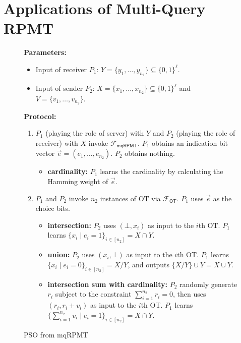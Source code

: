 \documentclass[a4paper,10pt]{article}
\newcommand{\FuncOT}{\mathcal{F}_\mathsf{OT}}
\newcommand{\FuncMQRPMT}{\mathcal{F}_\mathsf{mqRPMT}}
\begin{document}
\section{Applications of Multi-Query RPMT}
\begin{figure}[!hbtp]
\begin{framed}
\begin{minipage}[center]{\textwidth}
\begin{trivlist}
\item \textbf{Parameters:} 
\begin{itemize}
    \item Input of receiver $P_1$: $Y = \{y_1, \dots, y_{n_1}\} \subseteq \{0,1\}^\ell$.

    \item Input of sender $P_2$: $X = \{x_1, \dots, x_{n_2}\} \subseteq \{0,1\}^\ell$ 
        and $V = \{v_1, \dots, v_{n_2}\}$.
\end{itemize}

\item \textbf{Protocol:}

\begin{enumerate}
\item $P_1$ (playing the role of server) with $Y$ and $P_2$ (playing the role of receiver) with $X$
    invoke $\FuncMQRPMT$. $P_1$ obtains an indication bit vector $\vec{e} = (e_1, \dots, e_{n_2})$. 
    $P_2$ obtains nothing.  

    \begin{itemize}
        \item \textbf{cardinality:} $P_1$ learns the cardinality by calculating the Hamming weight of $\vec{e}$. 
    \end{itemize}

\item $P_1$ and $P_2$ invoke $n_2$ instances of OT via $\FuncOT$. 
    $P_1$ uses $\vec{e}$ as the choice bits. 


\begin{itemize}
    \item \textbf{intersection:} $P_2$ uses $(\bot, x_i)$ as input to the $i$th OT. 
        $P_1$ learns $\{x_i \mid e_i = 1\}_{i \in [n_2]} = X \cap Y$. 

    \item \textbf{union:} $P_2$ uses $(x_i, \bot)$ as input to the $i$th OT. 
        $P_1$ learns $\{x_i \mid e_i = 0\}_{i \in [n_2]} = X \slash Y$, and outputs $\{X \slash Y\} \cup Y = X \cup Y$. 

    \item \textbf{intersection sum with cardinality:} $P_2$ randomly generate $r_i$ 
        subject to the constraint $\sum_{i=1}^{n_2} r_i = 0$, then uses $(r_i, r_i + v_i)$ as input to the $i$th OT. 
        $P_1$ learns $\{\sum_{i=1}^{n_2} v_i \mid e_i = 1\}_{i \in [n_2]} = X \cap Y$. 
\end{itemize} 

\end{enumerate}
\end{trivlist}
\end{minipage}
\end{framed}
\caption{PSO from mqRPMT}\label{fig:PSO-from-mqRPMT}
\end{figure} 
\end{document}
